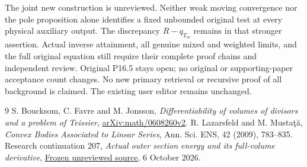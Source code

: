\documentclass[11pt]{article}
\begin{document}
The joint new construction is unreviewed. Neither weak moving
convergence nor the pole proposition alone identifies a fixed
unbounded original test at every physical auxiliary output.
The discrepancy $R-q_{T_m}$ remains in that stronger assertion.
Actual inverse attainment, all genuine mixed and weighted limits,
and the full original equation still require their complete proof
chains and independent review. Original P16.5 stays open;
no original or supporting-paper acceptance count changes.
No new primary retrieval or recursive proof of all background is
claimed. The existing user editor remains unchanged.
\begin{thebibliography}{9}
\small
{} S. Boucksom, C. Favre and M. Jonsson,
\emph{Differentiability of volumes of divisors and a problem of Teissier},
\href{https://arxiv.org/html/math/0608260v2}{arXiv:math/0608260v2}.
 R. Lazarsfeld and M. Musta\c t\u a,
\emph{Convex Bodies Associated to Linear Series}, Ann. Sci. ENS,
42 (2009), 783--835.
 Research continuation 207,
\emph{Actual outer section energy and its full-volume derivative},
\href{https://github.com/MingchenXia/nonarchimedean-pluripotential-theory/blob/a61bb373885ed4a270f528a5eae0d51799931df8/research-checkpoints/continuation172/root-checks/P16.5-actual-outer-energy-and-full-volume-derivative-candidate-20261006-continuation207.tex}{Frozen unreviewed source}, 6 October 2026.
\end{thebibliography}
\end{document}
